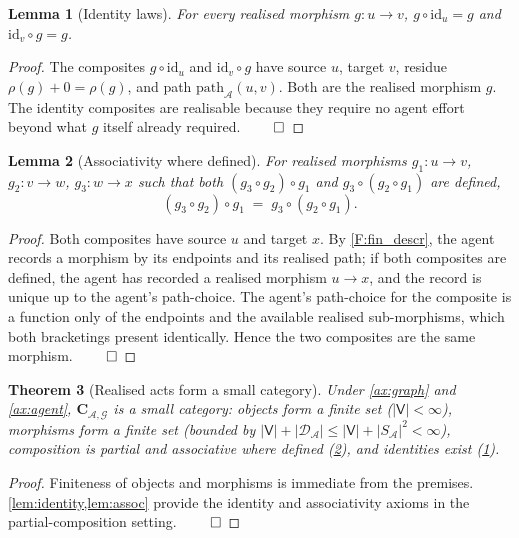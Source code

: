 \documentclass[11pt,twocolumn,a4paper]{article}
\theoremstyle{thmstyle}
\newtheorem{theorem}{Theorem}[section]
\newtheorem{lemma}[theorem]{Lemma}
\theoremstyle{definition}
\theoremstyle{remark}
\newcommand{\Graph}{\mathcal{G}}
\newcommand{\Vrt}{\mathsf{V}}
\newcommand{\Agent}{\mathcal{A}}
\newcommand{\Res}{\rho}
\begin{document}
\begin{lemma}[Identity laws]
\label{lem:identity}
For every realised morphism $g: u \to v$,
$g \circ \mathrm{id}_u = g$ and $\mathrm{id}_v \circ g = g$.
\end{lemma}

\begin{proof}
The composites $g \circ \mathrm{id}_u$ and $\mathrm{id}_v \circ g$
have source $u$, target $v$, residue $\Res(g) + 0 = \Res(g)$, and
path $\mathrm{path}_\Agent(u,v)$. Both are the realised morphism
$g$. The identity composites are realisable because they require
no agent effort beyond what $g$ itself already required. $\qed$
\end{proof}

\begin{lemma}[Associativity where defined]
\label{lem:assoc}
For realised morphisms $g_1: u \to v$, $g_2: v \to w$,
$g_3: w \to x$ such that both $(g_3 \circ g_2) \circ g_1$ and
$g_3 \circ (g_2 \circ g_1)$ are defined,
\[
  (g_3 \circ g_2) \circ g_1 \;=\; g_3 \circ (g_2 \circ g_1).
\]
\end{lemma}

\begin{proof}
Both composites have source $u$ and target $x$. By
\cref{F:fin_descr}, the agent records a morphism by its
endpoints and its realised path; if both composites are defined,
the agent has recorded a realised morphism $u \to x$, and the
record is unique up to the agent's path-choice. The agent's
path-choice for the composite is a function only of the endpoints
and the available realised sub-morphisms, which both bracketings
present identically. Hence the two composites are the same
morphism. $\qed$
\end{proof}

\begin{theorem}[Realised acts form a small category]
\label{thm:category}
Under \cref{ax:graph} and \cref{ax:agent},
$\mathbf{C}_{\Agent,\Graph}$ is a small category: objects form a
finite set ($|\Vrt| < \infty$), morphisms form a finite set
(bounded by $|\Vrt| + |\mathcal{D}_\Agent| \leq |\Vrt| +
|S_\Agent|^2 < \infty$), composition is partial and associative
where defined (\cref{lem:assoc}), and identities exist
(\cref{lem:identity}).
\end{theorem}

\begin{proof}
Finiteness of objects and morphisms is immediate from the premises.
\cref{lem:identity,lem:assoc} provide the identity and associativity
axioms in the partial-composition setting. $\qed$
\end{proof}
\end{document}
